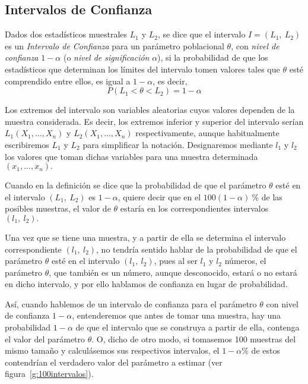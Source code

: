 \subsection{Intervalos de Confianza}
Dados dos estadísticos muestrales $L_1$ y $L_2$, se dice que el intervalo $I=(L_1,\ L_2)$ es un \emph{Intervalo de
Confianza} para un parámetro poblacional $\theta$, con \emph{nivel de confianza} $1-\alpha$ (o \emph{nivel de
significación} $\alpha $), si la probabilidad de que los estadísticos que determinan los límites del intervalo tomen
valores tales que $\theta$ esté comprendido entre ellos, es igual a $1-\alpha$, es decir, \[ P\left( L_{1}<\theta
<L_{2}\right) =1-\alpha \]

Los extremos del intervalo son variables aleatorias cuyos valores dependen de la muestra considerada. Es decir, los
extremos inferior y superior del intervalo serían $L_{1}\left( X_{1},...,X_{n}\right) $ y $L_{2}\left(
X_{1},...,X_{n}\right)$ respectivamente, aunque habitualmente escribiremos $L_{1}$ y $L_{2}$ para simplificar la
notación. Designaremos mediante $l_{1}$ y $l_{2}$ los valores que toman dichas variables para una muestra determinada
$\left( x_{1},...,x_{n}\right).$

Cuando en la definición se dice que la probabilidad de que el parámetro $\theta $ esté en el intervalo $\left( L_{1},\
L_{2}\right) $ es $1-\alpha $, quiere decir que en el $100 \left( 1-\alpha \right) \ \% $ de las posibles muestras, el
valor de $\theta $ estaría en los correspondientes intervalos $\left( l_{1},\ l_{2}\right) .$

Una vez que se tiene una muestra, y a partir de ella se determina el intervalo correspondiente $\left( l_{1},\
l_{2}\right) $, no tendría sentido hablar de la probabilidad de que el parámetro $\theta $ esté en el intervalo $\left(
l_{1},\ l_{2}\right) $, pues al ser $l_{1}$ y $l_{2}$ números, el parámetro $\theta $, que también es un número, aunque
desconocido, estará o no estará en dicho intervalo, y por ello hablamos de confianza en lugar de probabilidad.

Así, cuando hablemos de un intervalo de confianza para el parámetro $\theta $ con nivel de confianza $1-\alpha $,
entenderemos que antes de tomar una muestra, hay una probabilidad $1-\alpha $ de que el intervalo que se construya a
partir de ella, contenga el valor del parámetro $\theta$. O, dicho de otro modo, si tomasemos 100 muestras del mismo
tamaño y calculásemos sus respectivos intervalos, el $1-\alpha\%$ de estos contendrían el verdadero valor del parámetro a
estimar (ver figura~\ref{g:100intervalos}).

